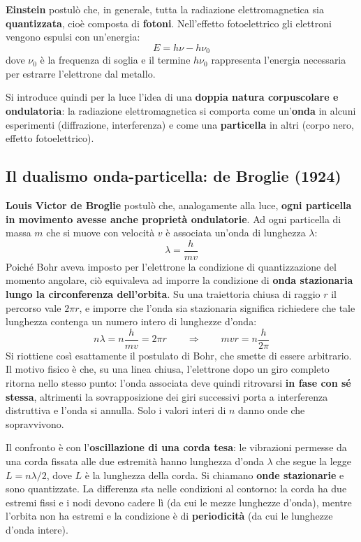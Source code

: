 \documentclass[11pt, a4paper, openright]{book}
\begin{document}
\textbf{Einstein} postulò che, in generale, tutta la radiazione elettromagnetica sia \textbf{quantizzata}, cioè composta di \textbf{fotoni}. Nell'effetto fotoelettrico gli elettroni vengono espulsi con un'energia:
\[
E = h\nu - h\nu_{0}
\]
dove $\nu_0$ è la frequenza di soglia e il termine $h\nu_0$ rappresenta l'energia necessaria per estrarre l'elettrone dal metallo.

Si introduce quindi per la luce l'idea di una \textbf{doppia natura corpuscolare e ondulatoria}: la radiazione elettromagnetica si comporta come un'\textbf{onda} in alcuni esperimenti (diffrazione, interferenza) e come una \textbf{particella} in altri (corpo nero, effetto fotoelettrico).

\subsection{Il dualismo onda-particella: de Broglie (1924)}
\textbf{Louis Victor de Broglie} postulò che, analogamente alla luce, \textbf{ogni particella in movimento avesse anche proprietà ondulatorie}. Ad ogni particella di massa $m$ che si muove con velocità $v$ è associata un'onda di lunghezza $\lambda$:
\[
\lambda = \frac{h}{mv}
\]
Poiché Bohr aveva imposto per l'elettrone la condizione di quantizzazione del momento angolare, ciò equivaleva ad imporre la condizione di \textbf{onda stazionaria lungo la circonferenza dell'orbita}. Su una traiettoria chiusa di raggio $r$ il percorso vale $2\pi r$, e imporre che l'onda sia stazionaria significa richiedere che tale lunghezza contenga un numero intero di lunghezze d'onda:
\[
n\lambda = n\frac{h}{mv} = 2\pi r
\qquad \Longrightarrow \qquad
mvr = n\frac{h}{2\pi}
\]
Si riottiene così esattamente il postulato di Bohr, che smette di essere arbitrario. Il motivo fisico è che, su una linea chiusa, l'elettrone dopo un giro completo ritorna nello stesso punto: l'onda associata deve quindi ritrovarsi \textbf{in fase con sé stessa}, altrimenti la sovrapposizione dei giri successivi porta a interferenza distruttiva e l'onda si annulla. Solo i valori interi di $n$ danno onde che sopravvivono.

Il confronto è con l'\textbf{oscillazione di una corda tesa}: le vibrazioni permesse da una corda fissata alle due estremità hanno lunghezza d'onda $\lambda$ che segue la legge $L = n\lambda/2$, dove $L$ è la lunghezza della corda. Si chiamano \textbf{onde stazionarie} e sono quantizzate. La differenza sta nelle condizioni al contorno: la corda ha due estremi fissi e i nodi devono cadere lì (da cui le mezze lunghezze d'onda), mentre l'orbita non ha estremi e la condizione è di \textbf{periodicità} (da cui le lunghezze d'onda intere).
\end{document}
